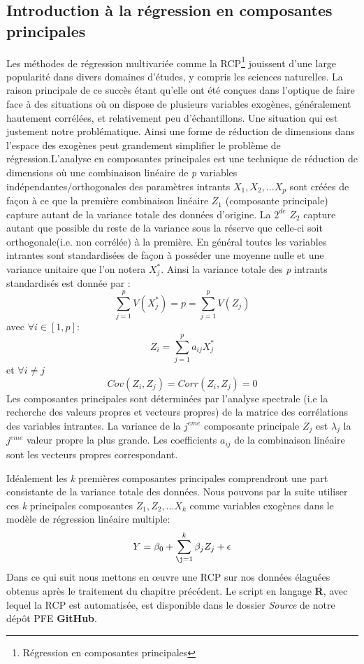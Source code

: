 	\subsection{Introduction à la régression en composantes principales}
	Les méthodes de régression multivariée comme la RCP\footnote{Régression en composantes principales} jouissent d'une large popularité dans divers domaines d'études, y compris les sciences naturelles. La raison principale de ce succès étant qu'elle ont été conçues dans l'optique de faire face à des situations où on dispose de plusieurs variables exogènes, généralement hautement corrélées, et relativement peu d'échantillons. Une situation qui est justement notre problématique. Ainsi une forme de réduction de dimensions dans l'espace des exogènes peut grandement simplifier le problème de régression.L'analyse en composantes principales est une technique de réduction de dimensions où une combinaison linéaire de \textit{p} variables indépendantes/orthogonales des paramètres intrants $X_1,X_2,...X_p$ sont créées de façon à ce que la première combinaison linéaire $Z_{1}$ (composante principale) capture autant de la variance totale des données d'origine. La $2^{de}$ $Z_{2}$ capture autant que possible du reste de la variance sous la réserve que celle-ci soit orthogonale(i.e. non corrélée) à la première. En général toutes les variables intrantes sont standardisées de façon à posséder une moyenne nulle et une variance unitaire que l'on notera $X_{j}^{*}$. Ainsi la variance totale des \textit{p} intrants standardisés est donnée par :
	\begin{equation*}
	\sum_{j=1}^{p} V(X_{j}^{*}) = p = \sum_{j=1}^{p}V(Z_{j})
	\end{equation*}
	avec $\forall i \in [1,p]$:
	\begin{equation*}
	Z_i = \sum_{j=1}^{p} a_{ij} X_{j}^{*} 
	\end{equation*}
	et $\forall i \neq j$
	\begin{equation*}
		Cov(Z_i,Z_j) = Corr(Z_i,Z_j) = 0
	\end{equation*}
	Les composantes principales sont déterminées par l'analyse spectrale (i.e la recherche des valeurs propres et vecteurs propres) de la matrice des corrélations des variables intrantes. La variance de la $j^{eme}$ composante principale $Z_{j}$ est $\lambda_{j}$ la $j^{eme}$ valeur propre la plus grande. Les coefficients $a_{ij}$ de la combinaison linéaire sont les vecteurs propres correspondant.\par
	Idéalement les \textit{k} premières composantes principales comprendront une part consistante de la variance totale des données. Nous pouvons par la suite utiliser ces \textit{k} principales composantes $Z_1,Z_2,...X_k$ comme variables exogènes dans le modèle de régression linéaire multiple:
		\begin{equation*}
		Y=\beta_0 + \sum_{\j=1}^{k} \beta_jZ_j + \epsilon 
		\end{equation*}
	Dans ce qui suit nous mettons en œuvre une RCP sur nos données élaguées obtenus après le traitement du chapitre précédent. Le script en langage \textbf{R}, avec lequel la RCP est automatisée, est disponible dans le dossier \textit{Source} de notre dépôt PFE \textbf{GitHub}\cite{this}.
